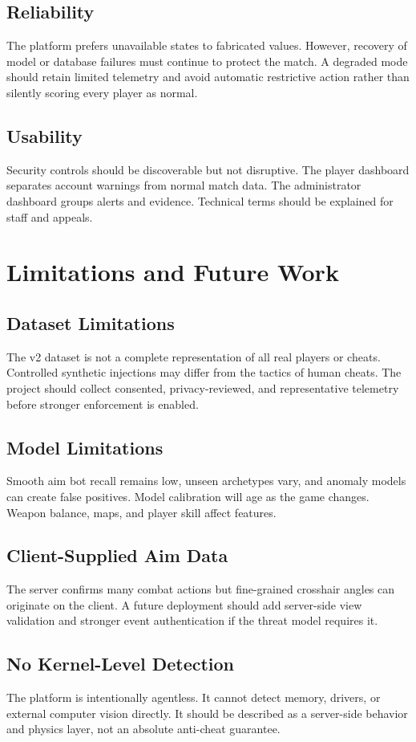 \documentclass[12pt,a4paper,oneside]{report}
\begin{document}
\section{Reliability}
The platform prefers unavailable states to fabricated values. However, recovery of model or database failures must continue to protect the match. A degraded mode should retain limited telemetry and avoid automatic restrictive action rather than silently scoring every player as normal.

\section{Usability}
Security controls should be discoverable but not disruptive. The player dashboard separates account warnings from normal match data. The administrator dashboard groups alerts and evidence. Technical terms should be explained for staff and appeals.

\chapter{Limitations and Future Work}
\section{Dataset Limitations}
The v2 dataset is not a complete representation of all real players or cheats. Controlled synthetic injections may differ from the tactics of human cheats. The project should collect consented, privacy-reviewed, and representative telemetry before stronger enforcement is enabled.

\section{Model Limitations}
Smooth aim bot recall remains low, unseen archetypes vary, and anomaly models can create false positives. Model calibration will age as the game changes. Weapon balance, maps, and player skill affect features.

\section{Client-Supplied Aim Data}
The server confirms many combat actions but fine-grained crosshair angles can originate on the client. A future deployment should add server-side view validation and stronger event authentication if the threat model requires it.

\section{No Kernel-Level Detection}
The platform is intentionally agentless. It cannot detect memory, drivers, or external computer vision directly. It should be described as a server-side behavior and physics layer, not an absolute anti-cheat guarantee.
\end{document}
